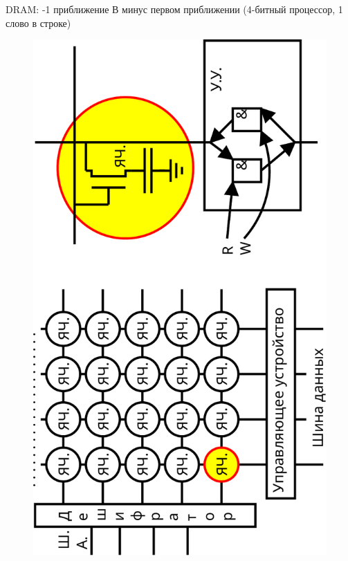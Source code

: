 \documentclass[xetex,aspectratio=43]{beamer}
\begin{document}
\begin{frame}{DRAM: -1 приближение}
    \alert{В минус первом приближении (4-битный процессор, 1 слово в строке)}

    \begin{figure}
        \includegraphics[angle=-90,origin=c,height=0.75\textheight]{img/09.dram-crop.pdf}
        \vspace{-20mm}
    \end{figure}

\end{frame}
\end{document}

